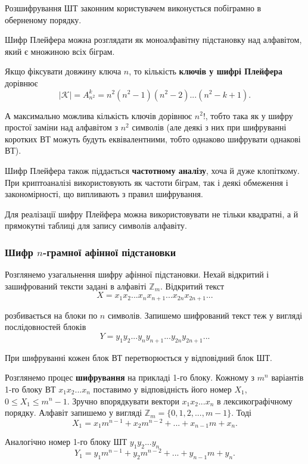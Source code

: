 Розшифрування ШТ законним користувачем виконується побіграмно в
оберненому порядку.

Шифр Плейфера можна розглядати як моноалфавітну підстановку над
алфавітом, який є множиною всіх біграм.

Якщо фіксувати довжину ключа $n$, то кількість \textbf{ключів у шифрі
Плейфера} дорівнює
$$|\mathcal{K}|
= A_{n^2}^k
= n^2 (n^2 - 1) (n^2 - 2) ... (n^2 - k + 1).$$

А максимально можлива кількість ключів дорівнює $n^2!$, тобто така як у
шифру простої заміни над алфавітом з $n^2$ символів (але деякі з них при
шифруванні коротких ВТ можуть будуть еквівалентними, тобто однаково
шифрувати однакові ВТ).

Шифр Плейфера також піддається \textbf{частотному аналізу}, хоча й дуже
клопіткому. При криптоаналізі використовують як частоти біграм, так і деякі
обмеження і закономірності, що випливають з правил шифрування.

\begin{remark}
    Для реалізації шифру Плейфера можна використовувати
    не тільки квадратні, а й прямокутні таблиці для запису символів алфавіту. 
\end{remark}

\subsubsection[Шифр н-грамної афінної підстановки]{Шифр $n$-грамної афінної підстановки}

Розглянемо узагальнення шифру афінної підстановки. Нехай відкритий і
зашифрований тексти задані в алфавіті $\mathbb{Z}_m$. Відкритий текст
$$X = x_1 x_2 ... x_n x_{n+1} ... x_{2n} x_{2n + 1} ...$$

розбивається на блоки по $n$ символів. Запишемо шифрований текст теж у
вигляді послідовностей блоків
$$Y = y_1 y_2 ... y_n y_{n+1} ... y_{2n} y_{2n + 1} ...$$

При шифруванні кожен блок ВТ перетворюється у відповідний блок ШТ.

Розглянемо процес \textbf{шифрування} на прикладі 1-го блоку. Кожному з
$m^n$ варіантів 1-го блоку ВТ $x_1 x_2 ... x_n$ поставимо у відповідність його номер
$X_1$, $0 \leqslant X_1 \leqslant m^n - 1$. Зручно впорядкувати вектори
$x_1 x_2 ... x_n$ в лексикографічному порядку. Алфавіт запишемо у вигляді
$\mathbb{Z}_m = \{0, 1, 2, ..., m - 1\}$. Тоді
$$X_1 = x_1 m^{n-1} + x_2 m^{n-2} + ... + x_{n-1} m + x_n.$$

Аналогічно номер 1-го блоку ШТ $y_1 y_2 ... y_n$
$$Y_1 = y_1 m^{n-1} + y_2 m^{n-2} + ... + y_{n-1} m + y_n.$$

